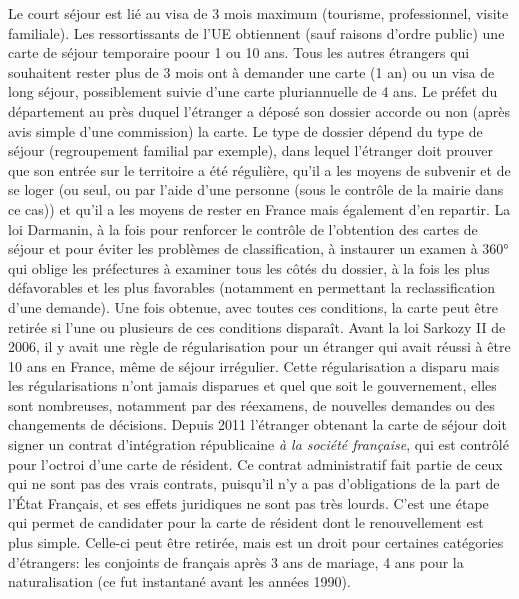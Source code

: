 \documentclass[math]{cours}
\begin{document}
Le court séjour est lié au visa de 3 mois maximum (tourisme, professionnel, visite familiale).
Les ressortissants de l'UE obtiennent (sauf raisons d'ordre public) une carte de séjour temporaire poour 1 ou 10 ans.
Tous les autres étrangers qui souhaitent rester plus de 3 mois ont à demander une carte (1 an) ou un visa de long séjour, possiblement suivie d'une carte pluriannuelle de 4 ans.
Le préfet du département au près duquel l'étranger a déposé son dossier accorde ou non (après avis simple d'une commission) la carte.
Le type de dossier dépend du type de séjour (regroupement familial par exemple), dans lequel l'étranger doit prouver que son entrée sur le territoire a été régulière, qu'il a les moyens de subvenir et de se loger (ou seul, ou par l'aide d'une personne (sous le contrôle de la mairie dans ce cas)) et qu'il a les moyens de rester en France mais également d'en repartir.
La loi Darmanin, à la fois pour renforcer le contrôle de l'obtention des cartes de séjour et pour éviter les problèmes de classification, à instaurer un examen à 360° qui oblige les préfectures à examiner tous les côtés du dossier, à la fois les plus défavorables et les plus favorables (notamment en permettant la reclassification d'une demande).
Une fois obtenue, avec toutes ces conditions, la carte peut être retirée si l'une ou plusieurs de ces conditions disparaît. Avant la loi Sarkozy II de 2006, il y avait une règle de régularisation pour un étranger qui avait réussi à être 10 ans en France, même de séjour irrégulier.
Cette régularisation a disparu mais les régularisations n'ont jamais disparues et quel que soit le gouvernement, elles sont nombreuses, notamment par des réexamens, de nouvelles demandes ou des changements de décisions.
Depuis 2011 l'étranger obtenant la carte de séjour doit signer un contrat d'intégration républicaine \emph{à la société française}, qui est contrôlé pour l'octroi d'une carte de résident.
Ce contrat administratif fait partie de ceux qui ne sont pas des vrais contrats, puisqu'il n'y a pas d'obligations de la part de l'État Français, et ses effets juridiques ne sont pas très lourds.
C'est une étape qui permet de candidater pour la carte de résident dont le renouvellement est plus simple.
Celle-ci peut être retirée, mais est un droit pour certaines catégories d'étrangers: les conjoints de français après 3 ans de mariage, 4 ans pour la naturalisation (ce fut instantané avant les années 1990).
\end{document}

